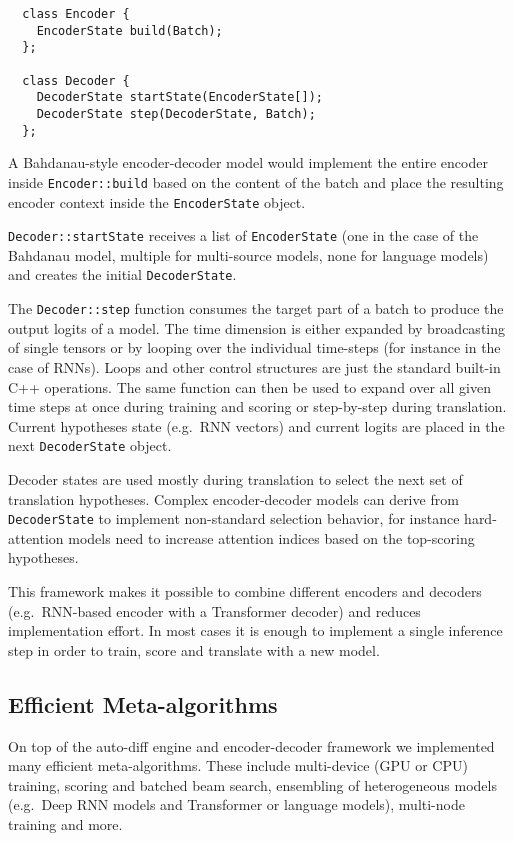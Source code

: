 \documentclass[11pt,a4paper]{article}
\begin{document}
  \begin{lstlisting}
  class Encoder {
    EncoderState build(Batch);
  };

  class Decoder {
    DecoderState startState(EncoderState[]);
    DecoderState step(DecoderState, Batch);
  };
  \end{lstlisting}

  A Bahdanau-style encoder-decoder model would implement the entire encoder inside \lstinline|Encoder::build| based on the content of the batch and place the resulting encoder context inside the \lstinline|EncoderState| object. 

  \lstinline|Decoder::startState| receives a list of \lstinline|EncoderState| (one in the case of the Bahdanau model, multiple for multi-source models, none for language models) and creates the initial \lstinline|DecoderState|. 

  The \lstinline|Decoder::step| function consumes the target part of a batch to produce the output logits of a model. The time dimension is either expanded by broadcasting of single tensors or by looping over the individual time-steps (for instance in the case of RNNs). 
  Loops and other control structures are just the standard built-in C++ operations. 
  The same function can then be used to expand over all given time steps at once during training and scoring or step-by-step during translation. 
  Current hypotheses state (e.g.~RNN vectors) and current logits are placed in the next \lstinline|DecoderState| object. 

  Decoder states are used mostly during translation to select the next set of translation hypotheses. Complex encoder-decoder models can derive from \lstinline|DecoderState| to implement non-standard selection behavior, for instance hard-attention models need to increase attention indices based on the top-scoring hypotheses.

  This framework makes it possible to combine different encoders and decoders (e.g.~RNN-based encoder with a Transformer decoder) and reduces implementation effort. In most cases it is enough to implement a single inference step in order to train, score and translate with a new model. 

  \subsection{Efficient Meta-algorithms}

  On top of the auto-diff engine and encoder-decoder framework we implemented many efficient meta-algorithms. These include multi-device (GPU or CPU) training, scoring and batched beam search, ensembling of heterogeneous models (e.g.~Deep RNN models and Transformer or language models), multi-node training and more. 
\end{document}
